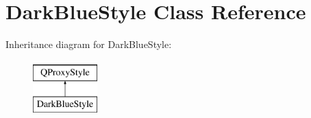 \hypertarget{class_dark_blue_style}{\section{Dark\-Blue\-Style Class Reference}
\label{class_dark_blue_style}
}
Inheritance diagram for Dark\-Blue\-Style\-:\begin{figure}[H]
\begin{center}
\leavevmode
\includegraphics[height=2.000000cm]{class_dark_blue_style}
\end{center}
\end{figure}
